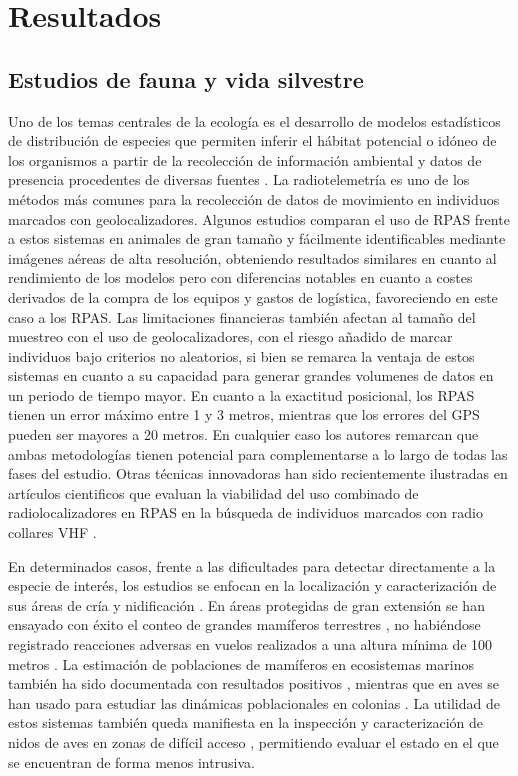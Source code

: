 \documentclass[onecolumn]{extarticle}
\begin{document}
\restoregeometry

\section{Resultados}\label{resultados}

\subsection{Estudios de fauna y vida
silvestre}\label{estudios-de-fauna-y-vida-silvestre}

Uno de los temas centrales de la ecología es el desarrollo de modelos
estadísticos de distribución de especies que permiten inferir el hábitat
potencial o idóneo de los organismos a partir de la recolección de
información ambiental y datos de presencia procedentes de diversas
fuentes \citep{Mateo2011}. La radiotelemetría es uno de los métodos más
comunes para la recolección de datos de movimiento en individuos
marcados con geolocalizadores. Algunos estudios comparan el uso de RPAS
frente a estos sistemas \citep{PazmanyMulero2015, Mulero-Pazmany2015} en
animales de gran tamaño y fácilmente identificables mediante imágenes
aéreas de alta resolución, obteniendo resultados similares en cuanto al
rendimiento de los modelos pero con diferencias notables en cuanto a
costes derivados de la compra de los equipos y gastos de logística,
favoreciendo en este caso a los RPAS. Las limitaciones financieras
también afectan al tamaño del muestreo con el uso de geolocalizadores,
con el riesgo añadido de marcar individuos bajo criterios no aleatorios,
si bien se remarca la ventaja de estos sistemas en cuanto a su capacidad
para generar grandes volumenes de datos en un periodo de tiempo mayor.
En cuanto a la exactitud posicional, los RPAS tienen un error máximo
entre 1 y 3 metros, mientras que los errores del GPS pueden ser mayores
a 20 metros. En cualquier caso los autores remarcan que ambas
metodologías tienen potencial para complementarse a lo largo de todas
las fases del estudio. Otras técnicas innovadoras han sido recientemente
ilustradas en artículos cientificos que evaluan la viabilidad del uso
combinado de radiolocalizadores en RPAS en la búsqueda de individuos
marcados con radio collares VHF
\citep{Korner2010, Bayram2016, Cliff2015, Leonardo2013}.

En determinados casos, frente a las dificultades para detectar
directamente a la especie de interés, los estudios se enfocan en la
localización y caracterización de sus áreas de cría y nidificación
\citep{VanAndel2015}. En áreas protegidas de gran extensión se han
ensayado con éxito el conteo de grandes mamíferos terrestres , no
habiéndose registrado reacciones adversas en vuelos realizados a una
altura mínima de 100 metros \citep{Vermeulen2013}. La estimación de
poblaciones de mamíferos en ecosistemas marinos también ha sido
documentada con resultados positivos \citep{Hodgson2013}, mientras que
en aves se han usado para estudiar las dinámicas poblacionales en
colonias \citep{Sarda-Palomera2012}. La utilidad de estos sistemas
también queda manifiesta en la inspección y caracterización de nidos de
aves en zonas de difícil acceso \citep{Weissensteiner2015}, permitiendo
evaluar el estado en el que se encuentran de forma menos intrusiva.
\end{document}
